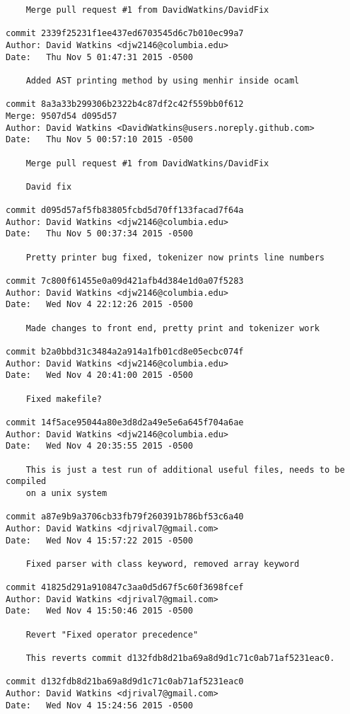 \begin{verbatim}
    Merge pull request #1 from DavidWatkins/DavidFix

commit 2339f25231f1ee437ed6703545d6c7b010ec99a7
Author: David Watkins <djw2146@columbia.edu>
Date:   Thu Nov 5 01:47:31 2015 -0500

    Added AST printing method by using menhir inside ocaml

commit 8a3a33b299306b2322b4c87df2c42f559bb0f612
Merge: 9507d54 d095d57
Author: David Watkins <DavidWatkins@users.noreply.github.com>
Date:   Thu Nov 5 00:57:10 2015 -0500

    Merge pull request #1 from DavidWatkins/DavidFix
    
    David fix

commit d095d57af5fb83805fcbd5d70ff133facad7f64a
Author: David Watkins <djw2146@columbia.edu>
Date:   Thu Nov 5 00:37:34 2015 -0500

    Pretty printer bug fixed, tokenizer now prints line numbers

commit 7c800f61455e0a09d421afb4d384e1d0a07f5283
Author: David Watkins <djw2146@columbia.edu>
Date:   Wed Nov 4 22:12:26 2015 -0500

    Made changes to front end, pretty print and tokenizer work

commit b2a0bbd31c3484a2a914a1fb01cd8e05ecbc074f
Author: David Watkins <djw2146@columbia.edu>
Date:   Wed Nov 4 20:41:00 2015 -0500

    Fixed makefile?

commit 14f5ace95044a80e3d8d2a49e5e6a645f704a6ae
Author: David Watkins <djw2146@columbia.edu>
Date:   Wed Nov 4 20:35:55 2015 -0500

    This is just a test run of additional useful files, needs to be compiled
    on a unix system

commit a87e9b9a3706cb33fb79f260391b786bf53c6a40
Author: David Watkins <djrival7@gmail.com>
Date:   Wed Nov 4 15:57:22 2015 -0500

    Fixed parser with class keyword, removed array keyword

commit 41825d291a910847c3aa0d5d67f5c60f3698fcef
Author: David Watkins <djrival7@gmail.com>
Date:   Wed Nov 4 15:50:46 2015 -0500

    Revert "Fixed operator precedence"
    
    This reverts commit d132fdb8d21ba69a8d9d1c71c0ab71af5231eac0.

commit d132fdb8d21ba69a8d9d1c71c0ab71af5231eac0
Author: David Watkins <djrival7@gmail.com>
Date:   Wed Nov 4 15:24:56 2015 -0500


\end{verbatim}
